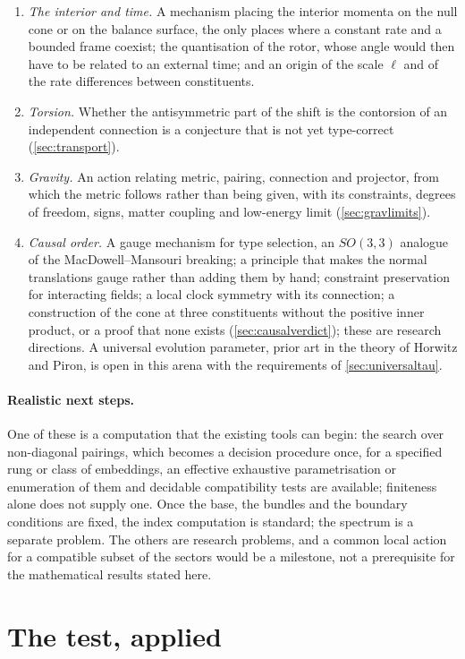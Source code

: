 \begin{enumerate}[label=(\arabic*),leftmargin=2.2em]
\item \emph{The interior and time.} A mechanism placing the interior momenta on the null cone or on the balance surface, the only places where a
constant rate and a bounded frame coexist; the quantisation of the rotor, whose angle would then have to be related to an external time; and
an origin of the scale $\ell$ and of the rate differences between constituents.
\item \emph{Torsion.} Whether the antisymmetric part of the shift is the contorsion of an independent connection is a conjecture that is not
yet type-correct (\cref{sec:transport}).
\item \emph{Gravity.} An action relating metric, pairing, connection and projector, from which the metric follows rather than being given,
with its constraints, degrees of freedom, signs, matter coupling and low-energy limit (\cref{sec:gravlimits}).
\item \emph{Causal order.} A gauge mechanism for type selection, an $SO(3,3)$ analogue of the MacDowell--Mansouri breaking; a principle that
makes the normal translations gauge rather than adding them by hand; constraint preservation for interacting fields; a local clock symmetry
with its connection; a construction of the cone at three constituents without the positive inner product, or a proof that none exists
(\cref{sec:causalverdict}); these are research directions. A universal evolution parameter, prior art in the theory of Horwitz and Piron, is
open in this arena with the requirements of \cref{sec:universaltau}.
\end{enumerate}

\paragraph{Realistic next steps.} One of these is a computation that the existing tools can begin: the search over non-diagonal pairings,
which becomes a decision procedure once, for a specified rung or class of embeddings, an effective exhaustive parametrisation or enumeration
of them and decidable compatibility tests are available; finiteness alone does not supply one. Once the base, the bundles and the boundary
conditions are fixed, the index computation is standard; the spectrum is a separate problem. The others are research problems,
and a common local action for a compatible subset of the sectors would be a milestone, not a prerequisite for the mathematical results
stated here.

\section{The test, applied}
\label{sec:testapplied}

